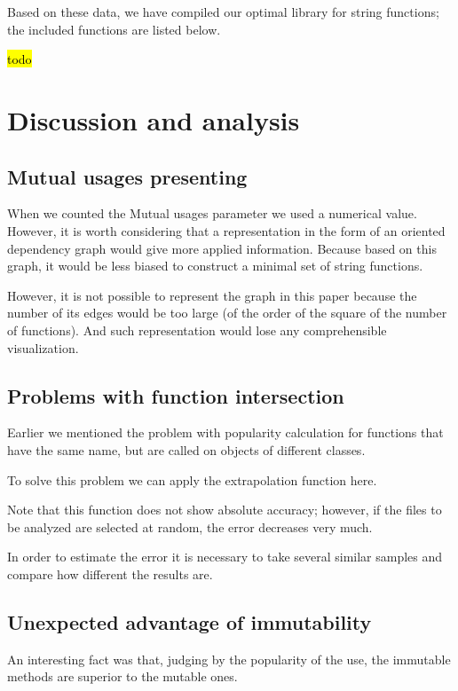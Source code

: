 \documentclass[anonymous,sigplan,review,11pt,nonacm,natbib=false]{acmart}
\begin{document}
    Based on these data, we have compiled our optimal library for string functions; the included functions are listed below.

    \hl{todo}

    \section{Discussion and analysis}

    \subsection{Mutual usages presenting}

    When we counted the Mutual usages parameter we used a numerical value. However, it is worth considering that a representation in the form of an oriented dependency graph would give more applied information. Because based on this graph, it would be less biased to construct a minimal set of string functions.

    However, it is not possible to represent the graph in this paper because the number of its edges would be too large (of the order of the square of the number of functions). And such representation would lose any comprehensible visualization.

    \subsection{Problems with function intersection}

    Earlier we mentioned the problem with popularity calculation for functions that have the same name, but are called on objects of different classes.

    To solve this problem we can apply the extrapolation function here.

    Note that this function does not show absolute accuracy; however, if the files to be analyzed are selected at random, the error decreases very much.

    In order to estimate the error it is necessary to take several similar samples and compare how different the results are.

    \subsection{Unexpected advantage of immutability}

    An interesting fact was that, judging by the popularity of the use, the immutable methods are superior to the mutable ones.
\end{document}

